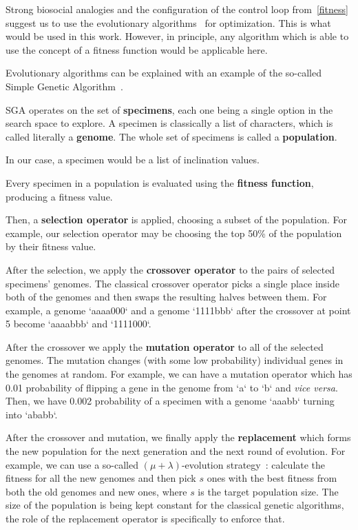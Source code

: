 \documentclass[11pt, a4paper]{article}
\begin{document}
	Strong biosocial analogies and the configuration of the control loop from~\ref{fitness} suggest us to use the evolutionary algorithms~\cite{evolutionary} for optimization.
	This is what would be used in this work.
	However, in principle, any algorithm which is able to use the concept of a fitness function would be applicable here.

  Evolutionary algorithms can be explained with an example of the so-called Simple Genetic Algorithm~\cite{pagmo:sga}.

  SGA operates on the set of \textbf{specimens}, each one being a single option in the search space to explore.
  A specimen is classically a list of characters, which is called literally a \textbf{genome}.
  The whole set of specimens is called a \textbf{population}.

  In our case, a specimen would be a list of inclination values.

  Every specimen in a population is evaluated using the \textbf{fitness function}, producing a fitness value.

  Then, a \textbf{selection operator} is applied, choosing a subset of the population.
  For example, our selection operator may be choosing the top 50\% of the population by their fitness value.

  After the selection, we apply the \textbf{crossover operator} to the pairs of selected specimens' genomes.
  The classical crossover operator picks a single place inside both of the genomes and then swaps the resulting halves between them.
  For example, a genome `aaaa000` and a genome `1111bbb` after the crossover at point 5 become `aaaabbb` and `1111000`.

  After the crossover we apply the \textbf{mutation operator} to all of the selected genomes.
  The mutation changes (with some low probability) individual genes in the genomes at random.
  For example, we can have a mutation operator which has 0.01 probability of flipping a gene in the genome from `a` to `b` and \textit{vice versa}.
  Then, we have 0.002 probability of a specimen with a genome `aaabb` turning into `ababb`.

  After the crossover and mutation, we finally apply the \textbf{replacement} which forms the new population for the next generation and the next round of evolution.
  For example, we can use a so-called $\left(\mu + \lambda\right)$-evolution strategy~\cite{muPlusLambda}: calculate the fitness for all the new genomes and then pick $s$ ones with the best fitness from both the old genomes and new ones, where $s$ is the target population size.
  The size of the population is being kept constant for the classical genetic algorithms, the role of the replacement operator is specifically to enforce that.
\end{document}
